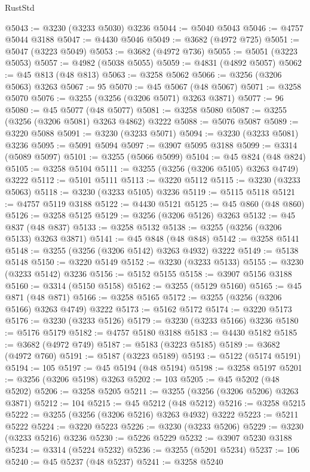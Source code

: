 \begin{lexlean}{RustStd}
\begin{coremodule}
@5043 := @3230 (@3233 @5030) @3236
@5044 := @5040 @5043
@5046 := @4757 @5044 @3188
@5047 := @4430 @5046
@5049 := @3682 (@4972 @725)
@5051 := @5047 (@3223 @5049)
@5053 := @3682 (@4972 @736)
@5055 := @5051 (@3223 @5053)
@5057 := @4982 (@5038 @5055)
@5059 := @4831 (@4892 @5057)
@5062 := @45 @813 (@48 @813)
@5063 := @3258 @5062
@5066 := @3256 (@3206 @5063) @3263
@5067 := 95
@5070 := @45 @5067 (@48 @5067)
@5071 := @3258 @5070
@5076 := @3255 (@3256 (@3206 @5071) @3263 @3871)
@5077 := 96
@5080 := @45 @5077 (@48 @5077)
@5081 := @3258 @5080
@5087 := @3255 (@3256 (@3206 @5081) @3263 @4862) @3222
@5088 := @5076 @5087
@5089 := @3220 @5088
@5091 := @3230 (@3233 @5071)
@5094 := @3230 (@3233 @5081) @3236
@5095 := @5091 @5094
@5097 := @3907 @5095 @3188
@5099 := @3314 (@5089 @5097)
@5101 := @3255 (@5066 @5099)
@5104 := @45 @824 (@48 @824)
@5105 := @3258 @5104
@5111 := @3255 (@3256 (@3206 @5105) @3263 @4749) @3222
@5112 := @5101 @5111
@5113 := @3220 @5112
@5115 := @3230 (@3233 @5063)
@5118 := @3230 (@3233 @5105) @3236
@5119 := @5115 @5118
@5121 := @4757 @5119 @3188
@5122 := @4430 @5121
@5125 := @45 @860 (@48 @860)
@5126 := @3258 @5125
@5129 := @3256 (@3206 @5126) @3263
@5132 := @45 @837 (@48 @837)
@5133 := @3258 @5132
@5138 := @3255 (@3256 (@3206 @5133) @3263 @3871)
@5141 := @45 @848 (@48 @848)
@5142 := @3258 @5141
@5148 := @3255 (@3256 (@3206 @5142) @3263 @4932) @3222
@5149 := @5138 @5148
@5150 := @3220 @5149
@5152 := @3230 (@3233 @5133)
@5155 := @3230 (@3233 @5142) @3236
@5156 := @5152 @5155
@5158 := @3907 @5156 @3188
@5160 := @3314 (@5150 @5158)
@5162 := @3255 (@5129 @5160)
@5165 := @45 @871 (@48 @871)
@5166 := @3258 @5165
@5172 := @3255 (@3256 (@3206 @5166) @3263 @4749) @3222
@5173 := @5162 @5172
@5174 := @3220 @5173
@5176 := @3230 (@3233 @5126)
@5179 := @3230 (@3233 @5166) @3236
@5180 := @5176 @5179
@5182 := @4757 @5180 @3188
@5183 := @4430 @5182
@5185 := @3682 (@4972 @749)
@5187 := @5183 (@3223 @5185)
@5189 := @3682 (@4972 @760)
@5191 := @5187 (@3223 @5189)
@5193 := @5122 (@5174 @5191)
@5194 := 105
@5197 := @45 @5194 (@48 @5194)
@5198 := @3258 @5197
@5201 := @3256 (@3206 @5198) @3263
@5202 := 103
@5205 := @45 @5202 (@48 @5202)
@5206 := @3258 @5205
@5211 := @3255 (@3256 (@3206 @5206) @3263 @3871)
@5212 := 104
@5215 := @45 @5212 (@48 @5212)
@5216 := @3258 @5215
@5222 := @3255 (@3256 (@3206 @5216) @3263 @4932) @3222
@5223 := @5211 @5222
@5224 := @3220 @5223
@5226 := @3230 (@3233 @5206)
@5229 := @3230 (@3233 @5216) @3236
@5230 := @5226 @5229
@5232 := @3907 @5230 @3188
@5234 := @3314 (@5224 @5232)
@5236 := @3255 (@5201 @5234)
@5237 := 106
@5240 := @45 @5237 (@48 @5237)
@5241 := @3258 @5240

\end{coremodule}
\end{lexlean}

